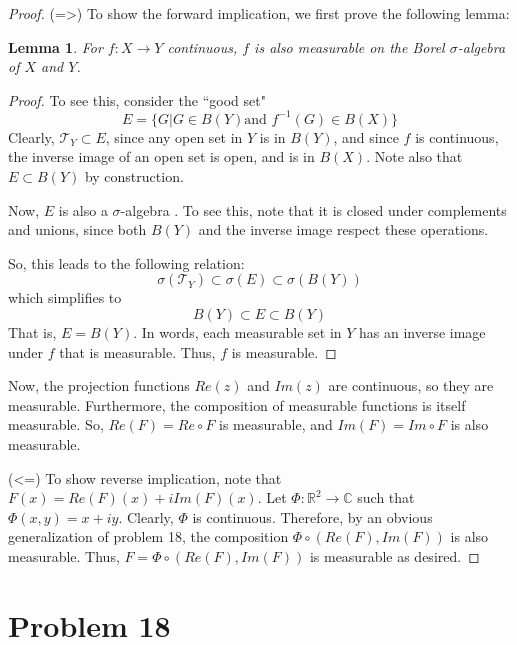\documentclass[paper=a4, fontsize=11pt]{scrartcl} %
\numberwithin{equation}{section} %
\numberwithin{figure}{section} %
\numberwithin{table}{section} %
\newcommand{\sigalg}{$\sigma$-algebra }
\newtheorem*{lemma}{Lemma}
\begin{document}
\begin{proof}
(=>) To show the forward implication, we first prove the following lemma:
\begin{lemma}
For $f:X\to Y$ continuous, $f$ is also measurable on the Borel \sigalg of $X$ and $Y$.
\end{lemma}
\begin{proof}
To see this, consider the ``good set"
\[
E = \{G | G\in B(Y) \textrm{and } f^{-1}(G)\in B(X)\}
\]
Clearly, $\mathscr{T}_Y \subset E$, since any open set in $Y$ is in $B(Y)$, and since
$f$ is continuous, the inverse image of an open set is open, and is in $B(X)$.
Note also that $E\subset B(Y)$ by construction.

Now, $E$ is also a \sigalg. To see this, note that it is closed under complements and
unions, since both $B(Y)$ and the inverse image respect these operations.

So, this leads to the following relation:
\[
\sigma(\mathscr{T}_Y) \subset \sigma(E) \subset \sigma(B(Y))
\]
which simplifies to
\[
B(Y) \subset E \subset B(Y)
\]
That is, $E = B(Y)$. In words, each measurable set in $Y$ has an inverse image under $f$
that is measurable. Thus, $f$ is measurable.
\end{proof}

Now, the projection functions $Re(z)$ and $Im(z)$ are continuous, so they are measurable.
Furthermore, the composition of measurable functions is itself measurable. So,
$Re(F) = Re\circ F$ is measurable, and $Im(F) = Im\circ F$ is also measurable.

(<=)
To show reverse implication, note that $F(x) = Re(F)(x) + i Im(F)(x)$.
Let $\Phi: \mathbb{R}^2 \to \mathbb{C}$ such that $\Phi(x,y) = x + i y$.
Clearly, $\Phi$ is continuous. Therefore, by an obvious generalization of problem 18,
the composition $\Phi\circ (Re(F), Im(F))$ is also measurable. Thus, $F = \Phi\circ (Re(F), Im(F))$
is measurable as desired.

\end{proof}



\section*{Problem 18}
\end{document}
